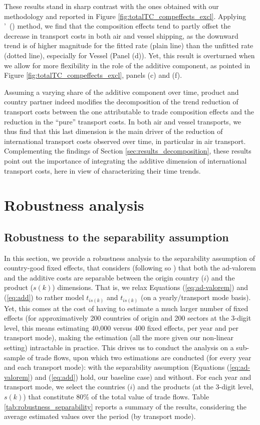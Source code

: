 \documentclass[a4paper,11pt]{article}
\newcommand\citeh[1]{\citeauthor{#1}'\ (\citeyear{#1})}
\begin{document}
These results stand in sharp contrast with the ones obtained with our methodology and reported in Figure \ref{fig:totalTC_compeffects_excl}.
Applying \citeh{hummels2007} method, we find that the composition effects tend to partly offset the decrease in transport costs in both air and vessel shipping, as the downward trend is of higher magnitude for the fitted rate (plain line) than the unfitted rate (dotted line), especially for Vessel (Panel (d)).
Yet, this result is overturned when we allow for more flexibility in the role of the additive component, as pointed in Figure \ref{fig:totalTC_compeffects_excl}, panels (c) and (f).\medskip


Assuming a varying share of the additive component over time, product and country partner indeed modifies the decomposition of the trend reduction of transport costs between the one attributable to trade composition effects and the reduction in the ``pure'' transport costs.
In both air and vessel transports, we thus find that this last dimension is the main driver of the reduction of international transport costs observed over time, in particular in air transport.
Complementing the findings of Section \ref{sec:results_decomposition}, these results point out the importance of integrating the additive dimension of international transport costs, here in view of characterizing their time trends.

\section{Robustness analysis \label{sec:robustness}}

\subsection{Robustness to the separability assumption}
In this section, we provide a robustness analysis to the separability assumption of country-good fixed effects, that considers (following so \citealp{Irrazabal_2015}) that both the ad-valorem and the additive costs are separable between the origin country ($i$) and the product ($s(k)$) dimensions.
That is, we relax Equations (\ref{eq:ad-valorem}) and (\ref{eq:add}) to rather model $t_{is(k)}$ and $t_{is(k)}$ (on a yearly/transport mode basis).
Yet, this comes at the cost of having to estimate a much larger number of fixed effects (for approximatively 200 countries of origin and 200 sectors at the 3-digit level, this means estimating 40,000 versus 400 fixed effects, per year and per transport mode), making the estimation (all the more given our non-linear setting) intractable in practice.
This drives us to conduct the analysis on a sub-sample of trade flows, upon which two estimations are conducted (for every year and each transport mode): with the separability assumption (Equations (\ref{eq:ad-valorem}) and (\ref{eq:add}) hold, our baseline case) and without.
For each year and transport mode, we select the countries ($i$) and the products (at the 3-digit level, $s(k)$) that constitute 80\% of the total value of trade flows. Table \ref{tab:robustness_separability} reports a summary of the results, considering the average estimated values over the period (by transport mode).
\end{document}
